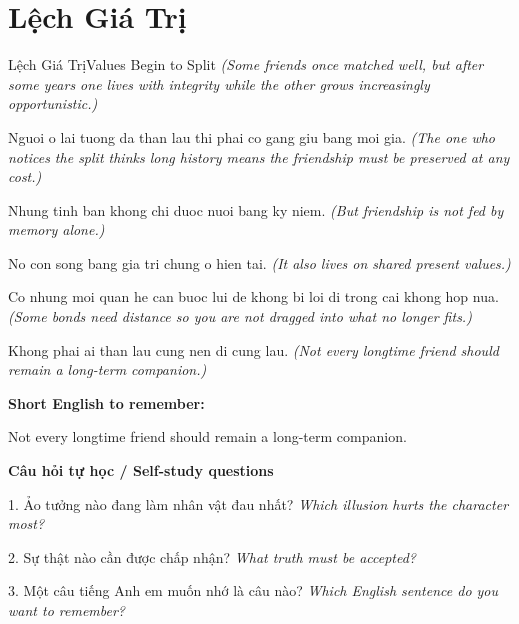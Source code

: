 \section{Lệch Giá Trị}
\begin{truyen}{Lệch Giá Trị}{Values Begin to Split}
\textit{(Some friends once matched well, but after some years one lives with integrity while the other grows increasingly opportunistic.)}

Nguoi o lai tuong da than lau thi phai co gang giu bang moi gia.
\textit{(The one who notices the split thinks long history means the friendship must be preserved at any cost.)}

Nhung tinh ban khong chi duoc nuoi bang ky niem.
\textit{(But friendship is not fed by memory alone.)}

No con song bang gia tri chung o hien tai.
\textit{(It also lives on shared present values.)}

Co nhung moi quan he can buoc lui de khong bi loi di trong cai khong hop nua.
\textit{(Some bonds need distance so you are not dragged into what no longer fits.)}

\end{truyen}

\begin{baihoc}
Khong phai ai than lau cung nen di cung lau.
\textit{(Not every longtime friend should remain a long-term companion.)}
\end{baihoc}

\begin{ghinhoanh}
\textbf{Short English to remember:}

Not every longtime friend should remain a long-term companion.

\end{ghinhoanh}

\begin{tuhocnhanh}
\textbf{Câu hỏi tự học / Self-study questions}

1. Ảo tưởng nào đang làm nhân vật đau nhất? \textit{Which illusion hurts the character most?}

2. Sự thật nào cần được chấp nhận? \textit{What truth must be accepted?}

3. Một câu tiếng Anh em muốn nhớ là câu nào? \textit{Which English sentence do you want to remember?}
\end{tuhocnhanh}
\ngancach

